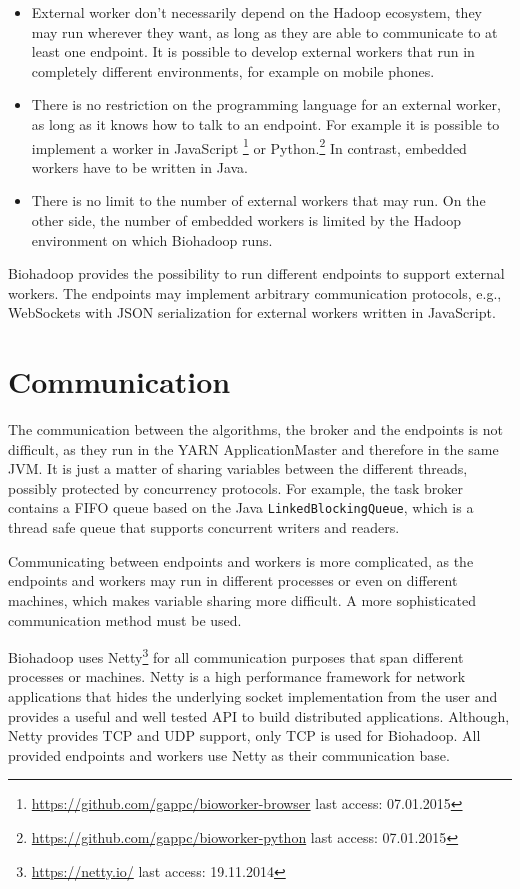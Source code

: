 \begin{itemize}
  \item External worker don't necessarily depend on the Hadoop ecosystem, they may run wherever they want, as long as they are able to communicate to at least one endpoint. It is possible to develop external workers that run in completely different environments, for example on mobile phones.
  \item There is no restriction on the programming language for an external worker, as long as it knows how to talk to an endpoint. For example it is possible to implement a worker in JavaScript \footnote{\url{https://github.com/gappc/bioworker-browser} last access: 07.01.2015} or Python.\footnote{\url{https://github.com/gappc/bioworker-python} last access: 07.01.2015} In contrast, embedded workers have to be written in Java.
  \item There is no limit to the number of external workers that may run. On the other side, the number of embedded workers is limited by the Hadoop environment on which Biohadoop runs.
\end{itemize}

Biohadoop provides the possibility to run different endpoints to support external workers. The endpoints may implement arbitrary communication protocols, e.g., WebSockets with JSON serialization for external workers written in JavaScript.

\section{Communication}
\label{chap:impl:communication}
The communication between the algorithms, the broker and the endpoints is not difficult, as they run in the YARN ApplicationMaster and therefore in the same JVM. It is just a matter of sharing variables between the different threads, possibly protected by concurrency protocols. For example, the task broker contains a FIFO queue based on the Java \texttt{LinkedBlockingQueue}, which is a thread safe queue that supports concurrent writers and readers.
  
Communicating between endpoints and workers is more complicated, as the endpoints and workers may run in different processes or even on different machines, which makes variable sharing more difficult. A more sophisticated communication method must be used.

Biohadoop uses Netty\footnote{\url{https://netty.io/} last access: 19.11.2014} for all communication purposes that span different processes or machines. Netty is a high performance framework for network applications that hides the underlying socket implementation from the user and provides a useful and well tested API to build distributed applications. Although, Netty provides TCP and UDP support, only TCP is used for Biohadoop. All provided endpoints and workers use Netty as their communication base.

